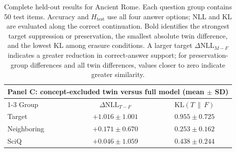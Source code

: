 \begin{table}[t]
  \vspace{1em}
  \begin{tabular}{lcc}
    \toprule
    \multicolumn{3}{l}{\textbf{Panel C: concept-excluded twin versus full model (mean $\pm$ SD)}} \\
    \cmidrule(lr){1-3}
    Group & $\Delta\mathrm{NLL}_{T-F}$ & $\mathrm{KL}(T\,\|\,F)$ \\
    \midrule
    Target      & $+1.016 \pm 1.001$ & $0.955 \pm 0.725$ \\
    Neighboring & $+0.171 \pm 0.670$ & $0.253 \pm 0.162$ \\
    SciQ        & $+0.046 \pm 1.059$ & $0.438 \pm 0.244$ \\
    \bottomrule
  \end{tabular}
  \caption{Complete held-out results for Ancient Rome. Each question group
  contains 50 test items. Accuracy and $H_{\mathrm{test}}$ use all four answer
  options; NLL and KL are evaluated along the correct continuation. Bold
  identifies the strongest target suppression or preservation, the smallest
  absolute twin difference, and the lowest KL among erasure conditions. A
  larger target $\Delta\mathrm{NLL}_{M-F}$ indicates a greater reduction in
  correct-answer support; for preservation-group differences and all twin
  differences, values closer to zero indicate greater similarity.}
  \label{tab:appendix-rome-results}
\end{table}

